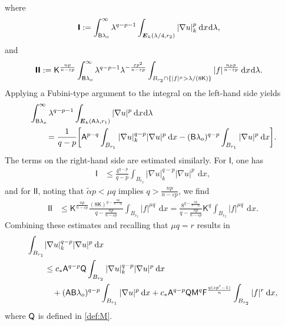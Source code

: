 \documentclass[10pt,letterpaper]{amsart}
\theoremstyle{definition}
\numberwithin{theorem}{section}
\numberwithin{equation}{section}
\newcommand{\1}{\ensuremath{\mathds{1}}}
\newcommand\sfI{{\boldsymbol{\mathsf I}}}
\renewcommand{\epsilon}{\varepsilon}
\newcommand{\eps}{\varepsilon}
\renewcommand{\epsilon}{\varepsilon}
\renewcommand{\d}{\:\! \mathrm{d}}
\numberwithin{equation}{section}
\begin{document}
where
\begin{align*}
    \sfI
    &:=
    \int_{{\sf B}\lambda_o}^\infty \lambda^{q-p-1} 
    \int_{\boldsymbol E_k(\lambda/4,r_2)} |\nabla u|_k^p \, \d x\d\lambda
   ,
\end{align*}
and
\begin{align*}
     \sfI\sfI
     &:=
    \mathsf K^{\frac{np}{n-\epsilon p}}
    \int_{{\sf B}\lambda_o}^\infty\lambda^{q-p-1}
    \lambda^{-\frac{\epsilon p^2}{n-\epsilon p}}
    \int_{B_{r_2} \cap \{|f|^\mu > \lambda/(8\mathsf K)\}} |f|^{\frac{n\mu p}{n-\epsilon p}} 
    \, \d x\d \lambda.
\end{align*}
Applying a Fubini-type argument to the integral on the left-hand side yields
\begin{align*}
    &\int_{{\sf B} \lambda_o}^\infty \lambda^{q-p-1} \int_{\boldsymbol E_k(\mathsf A\lambda,r_1)} |\nabla u|^p \, \d x \d \lambda\\
    &\qquad = 
    \frac{1}{q-p} \bigg[ \mathsf A^{p-q} \int_{B_{r_1}} |\nabla u|_k^{q-p} |\nabla u|^p  \, \d x  - 
    ({\sf B} \lambda_o)^{q-p} \int_{B_{r_1}} |\nabla u|^p \, \d x \bigg].
\end{align*}
The terms on the right-hand side are estimated similarly. For $\sfI$, one has
\begin{align*}
   \sfI
    &\leq 
    \frac{4^{q-p}}{q-p} \int_{B_{r_2}} |\nabla u|_k^{q-p} |\nabla u|^p  \, \d x,
\end{align*}
and for $\sfI\sfI$, noting that $\tilde\alpha p<\mu q$ implies $q > \frac{np}{n-\eps p}$, we find
\begin{align*}
    \sfI\sfI
    &\leq 
    \mathsf K^{\frac{np}{n-\epsilon p}}
    \frac{(8\mathsf K)^{q-\frac{np}{n-\epsilon p}}}{q-\frac{np}{n-\epsilon p}} \int_{B_{r_2}} |f|^{\mu q} \, \d x =
    \frac{8^{q-\frac{np}{n-\epsilon p}}}{q-\frac{np}{n-\epsilon p}} \mathsf K^{q}
    \int_{B_{r_2}} |f|^{\mu q} \, \d x.
\end{align*}
Combining these estimates and recalling that $\mu q=r$ results in
\begin{align*}
    \int_{B_{r_1}} &|\nabla u|_k^{q-p} |\nabla u|^p  \, \d x \\
    &\leq 
    c_\ast \mathsf A^{q-p} {\sf Q} \int_{B_{r_2}} |\nabla u|_k^{q-p} |\nabla u|^p  \, \d x\\
    &\phantom{\le\,} +
     (\mathsf A{\sf  B}\lambda_o)^{q-p} \int_{B_{r_1}} |\nabla u|^p \, \d x  + 
    c_\ast \mathsf A^{q-p} {\sf Q} 
   \mathsf M^{q} \mathsf F^\frac{q(sp'-1)}{n} \int_{B_{r_2}} |f|^{r} \, \d x,
\end{align*}
where ${\sf Q}$ is defined in \eqref{def:M}. 
\end{document}

